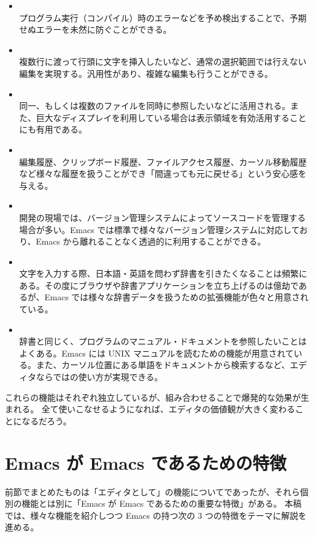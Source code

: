 \begin{itemize}\setlength{\leftskip}{-1.00zw}%
\item {}           \\
  プログラム実行（コンパイル）時のエラーなどを予め検出することで、予期せぬエラーを未然に防ぐことができる。
\item {}               \\
  複数行に渡って行頭に文字を挿入したいなど、通常の選択範囲では行えない編集を実現する。汎用性があり、複雑な編集も行うことができる。
\item {}         \\
  同一、もしくは複数のファイルを同時に参照したいなどに活用される。また、巨大なディスプレイを利用している場合は表示領域を有効活用することにも有用である。
\item {}                   \\
  編集履歴、クリップボード履歴、ファイルアクセス履歴、カーソル移動履歴など様々な履歴を扱うことができ「間違っても元に戻せる」という安心感を与える。
\item {}         \\
  開発の現場では、バージョン管理システムによってソースコードを管理する場合が多い。Emacs では標準で様々なバージョン管理システムに対応しており、Emacs から離れることなく透過的に利用することができる。
\item {}               \\
  文字を入力する際、日本語・英語を問わず辞書を引きたくなることは頻繁にある。その度にブラウザや辞書アプリケーションを立ち上げるのは億劫であるが、Emacs では様々な辞書データを扱うための拡張機能が色々と用意されている。
\item {} \\
  辞書と同じく、プログラムのマニュアル・ドキュメントを参照したいことはよくある。Emacs には UNIX マニュアルを読むための機能が用意されている。また、カーソル位置にある単語をドキュメントから検索するなど、エディタならではの使い方が実現できる。
\end{itemize}
これらの機能はそれぞれ独立しているが、組み合わせることで爆発的な効果が生まれる。
全て使いこなせるようになれば、エディタの価値観が大きく変わることになるだろう。
\section{Emacs が Emacs であるための特徴}
前節でまとめたものは「エディタとして」の機能についてであったが、それら個別の機能とは別に「Emacs が Emacs であるための重要な特徴」がある。
本稿では、様々な機能を紹介しつつ Emacs の持つ次の 3 つの特徴をテーマに解説を進める。
